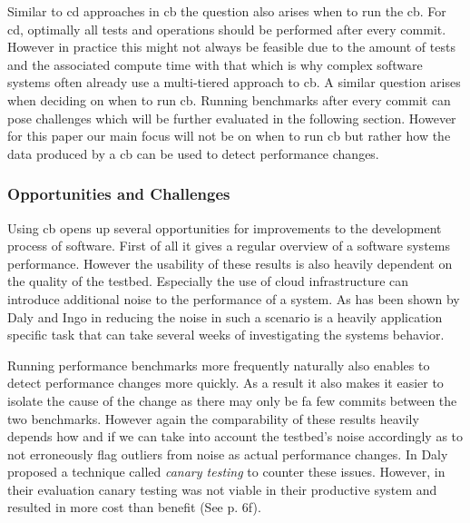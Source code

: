 \documentclass[	runningheads,
				a4paper]{llncs}
\begin{document}
	Similar to \gls{cd} approaches in \gls{cb} the question also arises when to run the \gls{cb}. For \gls{cd}, optimally all tests and operations should be performed after every commit. However in practice this might not always be feasible due to the amount of tests and the associated compute time with that which is why complex software systems often already use a multi-tiered approach to \gls{cb}. A similar question arises when deciding on when to run \gls{cb}. Running benchmarks after every commit can pose challenges which will be further evaluated in the following section. However for this paper our main focus will not be on when to run \gls{cb} but rather how the data produced by a \gls{cb} can be used to detect performance changes.

		\subsubsection{Opportunities and Challenges}
		\label{sssec:cd_challenges}

		Using \gls{cb} opens up several opportunities for improvements to the development process of software. First of all it gives a regular overview of a software systems performance. However the usability of these results is also heavily dependent on the quality of the testbed. Especially the use of cloud infrastructure can introduce additional noise to the performance of a system. As has been shown by Daly and Ingo in \cite{daly2019} reducing the noise in such a scenario is a heavily application specific task that can take several weeks of investigating the systems behavior.

	Running performance benchmarks more frequently naturally also enables to detect performance changes more quickly. As a result it also makes it easier to isolate the cause of the change as there may only be fa few commits between the two benchmarks. However again the comparability of these results heavily depends how and if we can take into account the testbed's noise accordingly as to not erroneously flag outliers from noise as actual performance changes. In \cite{daly2021} Daly proposed a technique called \textit{canary testing} to counter these issues. However, in their evaluation canary testing was not viable in their productive system and resulted in more cost than benefit (See \cite{daly2021} p. 6f).
\end{document}

